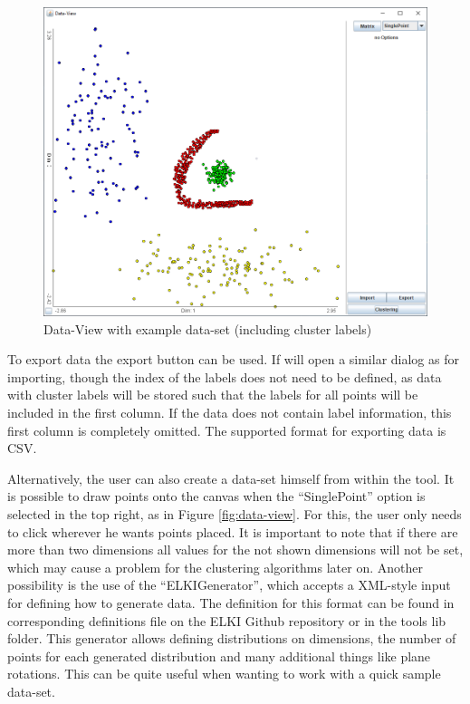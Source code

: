 \documentclass[
	a4paper,
	english,
	twoside,
	openright,               
	11pt                            
	]{report}
\begin{document}
\begin{figure}[H]
	\centering
	\includegraphics[scale=.45]{unob}
	\caption{Data-View with example data-set (including cluster labels)}
	\label{fig:loaded-data}
\end{figure}

To export data the export button can be used. If will open a similar dialog as for importing, though the index of the labels does not need to be defined, as data with cluster labels will be stored such that the labels for all points will be included in the first column. If the data does not contain label information, this first column is completely omitted. The supported format for exporting data is CSV.

Alternatively, the user can also create a data-set himself from within the tool. It is possible to draw points onto the canvas when the ``SinglePoint'' option is selected in the top right, as in Figure \ref{fig:data-view}. For this, the user only needs to click wherever he wants points placed. It is important to note that if there are more than two dimensions all values for the not shown dimensions will not be set, which may cause a problem for the clustering algorithms later on. Another possibility is the use of the ``ELKIGenerator'', which accepts a XML-style input for defining how to generate data. The definition for this format can be found in corresponding definitions file on the ELKI Github repository \cite{elkixml} or in the tools lib folder. This generator allows defining distributions on dimensions, the number of points for each generated distribution and many additional things like plane rotations. This can be quite useful when wanting to work with a quick sample data-set. 
\end{document}
